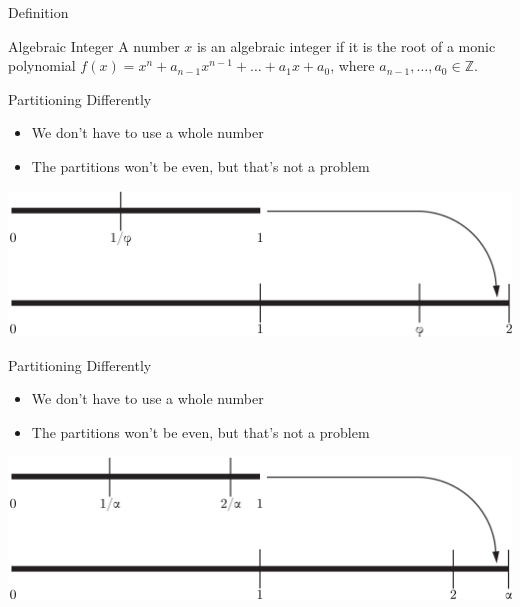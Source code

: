 \documentclass{beamer}
\begin{document}
\begin{frame}{Definition}
  \begin{block}{Algebraic Integer}
    A number $x$ is an algebraic integer if it is the root of a monic polynomial $f(x) = x^n + a_{n-1}x^{n-1}+\dots+a_1x+a_0$, where $a_{n-1},\dots,a_0\in\mathbb{Z}$.
  \end{block}
\end{frame}



\begin{frame}{Partitioning Differently}
  \begin{itemize}
    \item We don't have to use a whole number
    \item The partitions won't be even, but that's not a problem
  \end{itemize}
  \includegraphics[width=\textwidth]{images/partitioning/partitioningbeta}
\end{frame}

\begin{frame}{Partitioning Differently}
  \addtocounter{framenumber}{-1}
  \begin{itemize}
    \item We don't have to use a whole number
    \item The partitions won't be even, but that's not a problem
  \end{itemize}
  \includegraphics[width=\textwidth]{images/partitioning/partitioningalpha}
\end{frame}
\end{document}
